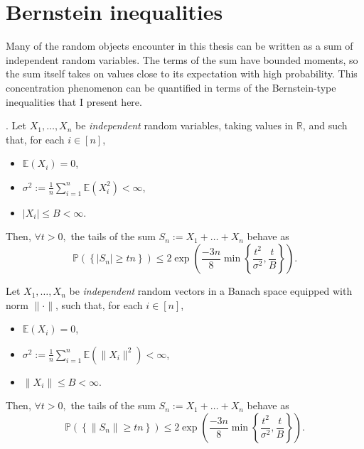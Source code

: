 \chapter{Bernstein inequalities}\label{ap:probabilistic_inequalities}

Many of the random objects encounter in this thesis can be written as a sum of independent random variables. The terms of the sum have bounded moments, so the sum itself takes on values close to its expectation with high probability. This concentration phenomenon can be quantified in terms of the Bernstein-type inequalities that I present here.

\begin{lemma}\label{lem:scalar_bern}.
    Let $X_1, \dots, X_n$ be \textit{independent} random variables, taking values in $\mathbb{R}$, and such that, for each $i \in [n]$,
    \begin{itemize}
        \item $\mathbb{E} \left ( X_i \right ) = 0$,
        \item $\sigma^2 := \frac{1}{n} \sum_{i=1}^{n} \mathbb{E} \left ( X_i^2 \right ) < \infty$,
        \item $ |X_i| \leq B < \infty$.
    \end{itemize}
    Then, $\forall t > 0,$ the tails of the sum $S_n := X_1 + \dots + X_n$ behave as
    \begin{equation}
        \mathbb{P} \left ( \left \{  |S_n| \geq t n \right \}\right ) \leq 2 \exp \left( \frac{-3 n}{8} \min \left \{ \frac{t^2}{\sigma^2}, \frac{t}{B} \right \} \right).
    \end{equation}
\end{lemma}

\begin{lemma}\label{lem:vector_bern}
    Let $X_1, \dots, X_n$ be \textit{independent} random vectors in a Banach space equipped with norm $\| \cdot \|$, such that, for each $i \in [n]$,
    \begin{itemize}
        \item $\mathbb{E} \left ( X_i \right ) = 0$,
        \item $\sigma^2 := \frac{1}{n} \sum_{i=1}^{n} \mathbb{E} \left ( \|X_i\|^2 \right ) < \infty$,
        \item $ \|X_i\| \leq B < \infty$.
    \end{itemize}
    Then, $\forall t > 0,$ the tails of the sum $S_n := X_1 + \dots + X_n$ behave as
    \begin{equation}
        \mathbb{P} \left ( \left \{  \| S_n \| \geq t n \right \}\right ) \leq 2 \exp \left( \frac{-3 n}{8} \min \left \{ \frac{t^2}{\sigma^2}, \frac{t}{B} \right \} \right).
    \end{equation}
\end{lemma}

